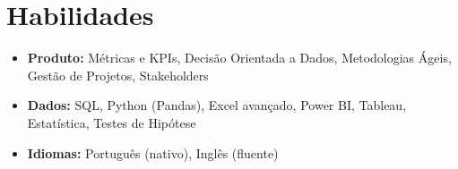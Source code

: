 \section{Habilidades}
\begin{itemize}[leftmargin=0.15in, label={}, itemsep=-3pt, topsep=2pt]
  \item \small{\textbf{Produto:} Métricas e KPIs, Decisão Orientada a Dados, Metodologias Ágeis, Gestão de Projetos, Stakeholders}
  \item \small{\textbf{Dados:} SQL, Python (Pandas), Excel avançado, Power BI, Tableau, Estatística, Testes de Hipótese}
  \item \small{\textbf{Idiomas:} Português (nativo), Inglês (fluente)}
\end{itemize}
